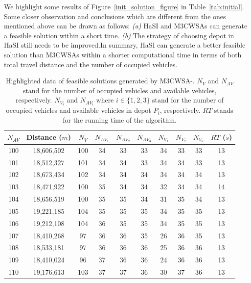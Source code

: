 \documentclass[journal]{IEEEtran}
\begin{document}

We highlight some results of Figure~\ref{init_solution_figure} in Table~\ref{tab:initial}. Some closer observation and conclusions which are different from the ones mentioned above can be drawn as follows: \emph{(a)} HaSI and M3CWSAs can generate a feasible solution within a short time. \emph{(b)} The strategy of choosing depot in HaSI still needs to be improved.In summary, HaSI can generate a better feasible solution than M3CWSAs within a shorter computational time in terms of both total travel distance and the number of occupied vehicles.

\begin{table}[htbp]
	\centering
	\caption{\label{tab:m3_cwsav2}
		Highlighted data of feasible solutions generated by M3CWSA-\uppercase\expandafter{}. $N_V$ and $N_{AV}$ stand for the number of occupied vehicles and available vehicles, respectively. $N_{V_i}$ and $N_{AV_i}$ where $i \in \{1, 2, 3\}$ stand for the number of occupied vehicles and available vehicles in depot $P_i$, respectively. $RT$ stands for the running time of the algorithm.}
	\setlength{\tabcolsep}{1.5pt}
	\begin{tabular}{|c|c|c|ccc|ccc|c|}
		\hline
		$N_{AV}$ & Distance ($m$) & $N_V$ & $N_{AV_1}$ & $N_{AV_2}$ & $N_{AV_3}$ & $N_{V_1}$ & $N_{V_2}$ & $N_{V_3}$ & $RT$ ($s$)\\
		\hline
		100 & 18,606,502 & 100 & 34 & 33 & 33 & 34 & 33 & 33 & 13 \\
		101 & 18,512,327 & 101 & 34 & 34 & 33 & 34 & 34 & 33 & 13 \\
		102 & 18,673,434 & 102 & 34 & 34 & 34 & 34 & 34 & 34 & 13 \\
		103 & 18,471,922 & 100 & 35 & 34 & 34 & 32 & 34 & 34 & 14 \\
		104 & 18,656,519 & 100 & 35 & 35 & 34 & 31 & 35 & 34 & 13 \\
		105 & 19,221,185 & 104 & 35 & 35 & 35 & 34 & 35 & 35 & 13 \\
		106 & 19,212,108 & 104 & 36 & 35 & 35 & 34 & 35 & 35 & 13 \\
		107 & 18,410,268 & 97 & 36 & 36 & 35 & 26 & 36 & 35 & 13 \\
		108 & 18,533,181 & 97 & 36 & 36 & 36 & 25 & 36 & 36 & 13 \\
		109 & 18,410,024 & 96 & 37 & 36 & 36 & 24 & 36 & 36 & 13 \\
		110 & 19,176,613 & 103 & 37 & 37 & 36 & 30 & 37 & 36 & 13 \\
		\hline
	\end{tabular}
\end{table}
\end{document}
